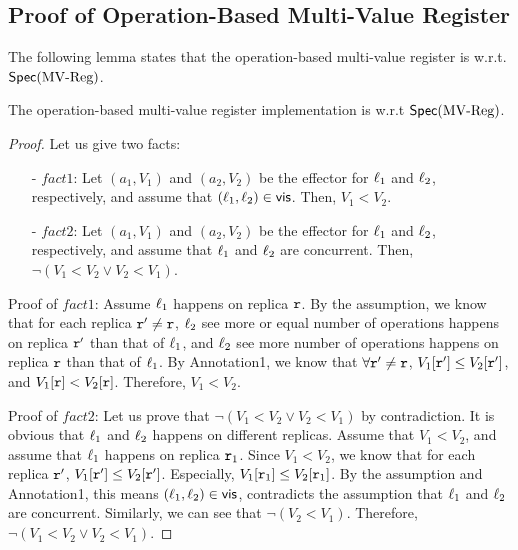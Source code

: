 \subsection{Proof of Operation-Based Multi-Value Register}
\label{subsec:proof of operation-based multi-value register}

The following lemma states that the operation-based multi-value register is \crdtlinearizable{} w.r.t. $\mathsf{Spec}(\text{MV\text{-}Reg})$.

\begin{lemma}
\label{lemma:multi-value register is correct}
The operation-based multi-value register implementation is \crdtlinearizable{} w.r.t $\mathsf{Spec}(\text{MV\text{-}Reg})$.
\end{lemma}

\begin {proof}

Let us give two facts:

\begin{itemize}
\setlength{\itemsep}{0.5pt}
\item[-] $fact1$: Let $(a_1,V_1)$ and $(a_2,V_2)$ be the effector for $\ell_1$ and $\ell_2$, respectively, and assume that $(\ell_1,\ell_2) \in \mathsf{vis}$. Then, $V_1 < V_2$.
\item[-] $fact2$: Let $(a_1,V_1)$ and $(a_2,V_2)$ be the effector for $\ell_1$ and $\ell_2$, respectively, and assume that $\ell_1$ and $\ell_2$ are concurrent. Then, $\neg (V_1 < V_2 \vee V_2 < V_1)$.

\end{itemize}


\noindent Proof of $fact1$: Assume $\ell_1$ happens on replica $\mathtt{r}$. By the {} assumption, we know that for each replica $\mathtt{r}' \neq \mathtt{r}$, $\ell_2$ see more or equal number of operations happens on replica $\mathtt{r}'$ than that of $\ell_1$, and $\ell_2$ see more number of operations happens on replica $\mathtt{r}$ than that of $\ell_1$. By Annotation1, we know that $\forall \mathtt{r}' \neq \mathtt{r}$, $V_1[\mathtt{r}'] \leq V_2[\mathtt{r}']$, and $V_1[\mathtt{r}] < V_2[\mathtt{r}]$. Therefore, $V_1 < V_2$.

\noindent Proof of $fact2$: Let us prove that $\neg (V_1 < V_2 \vee V_2 < V_1)$ by contradiction. It is obvious that $\ell_1$ and $\ell_2$ happens on different replicas. Assume that $V_1 < V_2$, and assume that $\ell_1$ happens on replica $\mathtt{r}_1$. Since $V_1 < V_2$, we know that for each replica $\mathtt{r}'$, $V_1[\mathtt{r}'] \leq V_2[\mathtt{r}']$. Especially, $V_1[\mathtt{r}_1] \leq V_2[\mathtt{r}_1]$. By the {} assumption and Annotation1, this means $(\ell_1,\ell_2) \in \mathsf{vis}$, contradicts the assumption that $\ell_1$ and $\ell_2$ are concurrent. Similarly, we can see that $\neg (V_2 < V_1)$. Therefore, $\neg (V_1 < V_2 \vee V_2 < V_1)$.


\end{proof}
